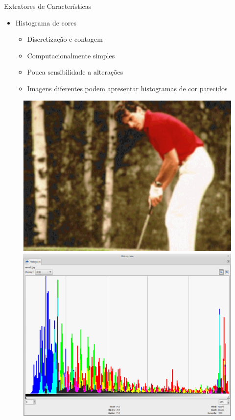 \documentclass{beamer}
\begin{document}
\begin{frame}{Extratores de Características}
  \begin{itemize}
   \item Histograma de cores
   \begin{itemize}
      \item Discretização e contagem\newline
      \item Computacionalmente simples\newline
      \item Pouca sensibilidade a alterações\newline
      \item Imagens diferentes podem apresentar histogramas de cor parecidos
  \end{itemize} 
 \end{itemize}
	\begin{figure}
\centering
\begin{minipage}{.4\textwidth}
  \centering
  \includegraphics[width=.9\linewidth]{same2.jpg}
\end{minipage}%
\begin{minipage}{.4\textwidth}
  \centering
  \includegraphics[width=.9\linewidth]{histo_same2.png}

\end{minipage}
\end{figure}

\end{frame}
\end{document}
